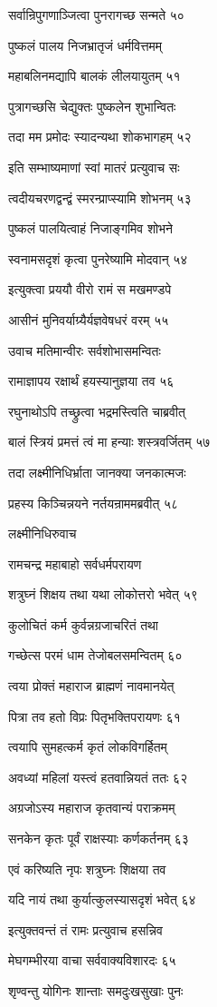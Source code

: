 सर्वान्रिपुगणाञ्जित्वा पुनरागच्छ सन्मते ५०

पुष्कलं पालय निजभ्रातृजं धर्मवित्तमम्

महाबलिनमद्यापि बालकं लीलयायुतम् ५१

पुत्रागच्छसि चेद्युक्तः पुष्कलेन शुभान्वितः

तदा मम प्रमोदः स्यादन्यथा शोकभागहम् ५२

इति सम्भाष्यमाणां स्वां मातरं प्रत्युवाच सः

त्वदीयचरणद्वन्द्वं स्मरन्प्राप्स्यामि शोभनम् ५३

पुष्कलं पालयित्वाहं निजाङ्गमिव शोभने

स्वनामसदृशं कृत्वा पुनरेष्यामि मोदवान् ५४

इत्युक्त्वा प्रययौ वीरो रामं स मखमण्डपे

आसीनं मुनिवर्याग्र्यैर्यज्ञवेषधरं वरम् ५५

उवाच मतिमान्वीरः सर्वशोभासमन्वितः

रामाज्ञापय रक्षार्थं हयस्यानुज्ञया तव ५६

रघुनाथोऽपि तच्छ्रुत्वा भद्रमस्त्विति चाब्रवीत्

बालं स्त्रियं प्रमत्तं त्वं मा हन्याः शस्त्रवर्जितम् ५७

तदा लक्ष्मीनिधिर्भ्राता जानक्या जनकात्मजः

प्रहस्य किञ्चिन्नयने नर्तयन्राममब्रवीत् ५८

लक्ष्मीनिधिरुवाच

रामचन्द्र महाबाहो सर्वधर्मपरायण

शत्रुघ्नं शिक्षय तथा यथा लोकोत्तरो भवेत् ५९

कुलोचितं कर्म कुर्वन्नग्रजाचरितं तथा

गच्छेत्स परमं धाम तेजोबलसमन्वितम् ६०

त्वया प्रोक्तं महाराज ब्राह्मणं नावमानयेत्

पित्रा तव हतो विप्रः पितृभक्तिपरायणः ६१

त्वयापि सुमहत्कर्म कृतं लोकविगर्हितम्

अवध्यां महिलां यस्त्वं हतवान्नियतं ततः ६२

अग्रजोऽस्य महाराज कृतवान्यं पराक्रमम्

सनकेन कृतः पूर्वं राक्षस्याः कर्णकर्तनम् ६३

एवं करिष्यति नृपः शत्रुघ्नः शिक्षया तव

यदि नायं तथा कुर्यात्कुलस्यासदृशं भवेत् ६४

इत्युक्तवन्तं तं रामः प्रत्युवाच हसन्निव

मेघगम्भीरया वाचा सर्ववाक्यविशारदः ६५

शृण्वन्तु योगिनः शान्ताः समदुःखसुखाः पुनः

